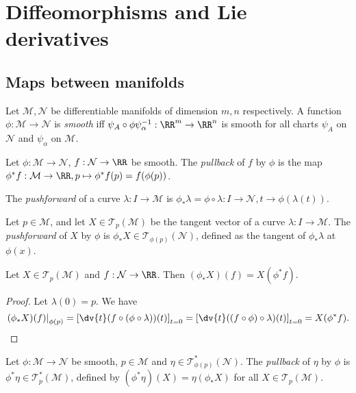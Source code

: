 \documentclass{jknotes}
\begin{document}
\section{Diffeomorphisms and Lie derivatives}

\subsection{Maps between manifolds}
\begin{defn}
    Let \(\mathcal{M},\mathcal{N}\) be differentiable manifolds of dimension \(m,n\) respectively. A function \(\phi:\mathcal{M}\to\mathcal{N}\) is \emph{smooth} iff \(\psi_A\circ\phi\psi_\alpha^{-1}:\RR^m\to\RR^n\) is smooth for all charts \(\psi_A\) on \(\mathcal{N}\) and \(\psi_\alpha\) on \(\mathcal{M}\).
\end{defn}
\begin{defn}
    Let \(\phi:\mathcal{M}\to\mathcal{N}\), \(f:\mathcal{N}\to\RR\) be smooth. The \emph{pullback} of \(f\) by \(\phi\) is the map \(\phi^*f:\mathcal{M}\to\RR,p\mapsto\phi^*f(p) = f(\phi(p))\).
\end{defn}
\begin{defn}
    The \emph{pushforward} of a curve \(\lambda:I\to\mathcal{M}\) is \(\phi_*\lambda = \phi\circ\lambda:I\to\mathcal{N},t\to\phi(\lambda(t))\).
\end{defn}
\begin{defn}
    Let \(p\in\mathcal{M}\), and let \(X\in\mathcal{T}_p(\mathcal{M})\) be the tangent vector of a curve \(\lambda:I\to\mathcal{M}\). The \emph{pushforward} of \(X\) by \(\phi\) is \(\phi_*X\in\mathcal{T}_{\phi(p)}(\mathcal{N})\), defined as the tangent of \(\phi_*\lambda\) at \(\phi(x)\).
\end{defn}

\begin{lemma}
    Let \(X\in\mathcal{T}_p(\mathcal{M})\) and \(f:\mathcal{N}\to\RR\). Then \((\phi_*X)(f) = X(\phi^*f)\).
\end{lemma}
\begin{proof}
    Let \(\lambda(0) = p\). We have
    \begin{equation}
        \left.(\phi_*X)(f)\right|_{\phi(p)} = \left[\dv{t}(f\circ(\phi\circ\lambda))(t)\right]_{t=0} = \left[\dv{t}((f\circ\phi)\circ\lambda)(t)\right]_{t=0} = X(\phi^*f).
    \end{equation}
\end{proof}

\begin{defn}
    Let \(\phi:\mathcal{M}\to\mathcal{N}\) be smooth, \(p\in\mathcal{M}\) and \(\eta\in\mathcal{T}^*_{\phi(p)}(\mathcal{N})\). The \emph{pullback} of \(\eta\) by \(\phi\) is \(\phi^*\eta\in\mathcal{T}_p^*(\mathcal{M})\), defined by \((\phi^*\eta)(X) = \eta(\phi_* X)\) for all \(X\in\mathcal{T}_p(\mathcal{M})\).
\end{defn}
\end{document}
